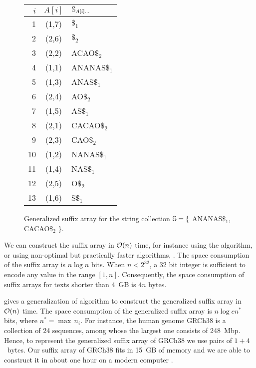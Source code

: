 \begin{figure}[h]
\begin{center}
\caption[Example of generalized suffix array]{Generalized suffix array for the string collection $\mathbb {S} = \{$ {\ttfamily ANANAS$\$_1$}, {\ttfamily CACAO$\$_2$} $\}$.}
\label{fig:gsa}
\ttfamily
\begin{tabular}{rcl}
$i$ & $A[i]$ & $\mathbb {S}_{A[i]\dots}$\\
\midrule
1 & (1,7) & $\$_1$\\
2 & (2,6) & $\$_2$\\
3 & (2,2) & ACAO$\$_2$\\
4 & (1,1) & ANANAS$\$_1$\\
5 & (1,3) & ANAS$\$_1$\\
6 & (2,4) & AO$\$_2$\\
7 & (1,5) & AS$\$_1$\\
8 & (2,1) & CACAO$\$_2$\\
9 & (2,3) & CAO$\$_2$\\
10 & (1,2) & NANAS$\$_1$\\
11 & (1,4) & NAS$\$_1$\\
12 & (2,5) & O$\$_2$\\
13 & (1,6) & S$\$_1$\\
\end{tabular}
\end{center}
\end{figure}

We can construct the suffix array in $\mathcal{O}(n)$ time, for instance using the \citep{Karkkainen2003} algorithm, or using non-optimal but practically faster algorithms, \eg \citep{Schurmann2007}.
The space consumption of the suffix array is $n \log{n}$ bits.
When $n < 2^{32}$, a 32 bit integer is sufficient to encode any value in the range $[1,n]$.
Consequently, the space consumption of suffix arrays for texts shorter than 4~GB is $4 n$ bytes.

\citep{Weese2013} gives a generalization of \citeauthor{Karkkainen2003} algorithm to construct the generalized suffix array in $\mathcal{O}(n)$ time.
The space consumption of the generalized suffix array is $n \log{cn^*}$ bits, where $n^* = \max{\,n_i}$.
For instance, the human genome GRCh38 is a collection of 24 sequences, among whose the largest one consists of 248~Mbp.
Hence, to represent the generalized suffix array of GRCh38 we use pairs of $1+4$~bytes.
Our suffix array of GRCh38 fits in 15~GB of memory and we are able to construct it in about one hour on a modern computer \citep{Weese2013}.


